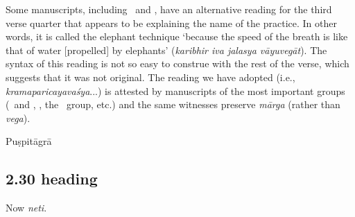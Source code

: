 \begin{ekdosis}
\begin{testimonia}[hp02_029]
\begin{versinnote}
\end{versinnote}
\end{testimonia}

\begin{philcomm}[hp02_029]
Some manuscripts, including \etaTwo\ and \betaOmega, have an alternative reading for the third verse quarter that appears to be explaining the name of the practice. In other words, it is called the elephant technique `because the speed of the breath is like that of water [propelled] by elephants’ (\emph{karibhir iva jalasya vāyuvegāt}). The syntax of this reading is not so easy to construe with the rest of the verse, which suggests that it was not original. The reading we have adopted (i.e., \emph{kramaparicayavaśya}...) is attested by manuscripts of the most important groups (\alphaOne\ and \alphaTwo, \betaTwo, the \textgamma\ group, etc.) and the same witnesses preserve \emph{mārga} (rather than \emph{vega}). 

\end{philcomm}

\begin{metre}[hp02_029]
Puṣpitāgrā
\end{metre}

\subsection*{2.30 heading}
\begin{translation}[hp02_030a]
Now \emph{neti}.
\end{translation}



\end{ekdosis}
